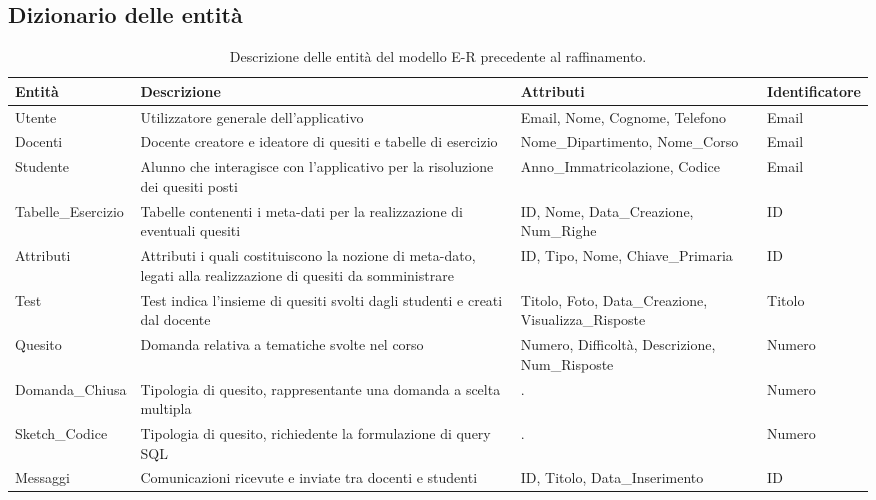 \documentclass{article}
\begin{document}
\subsection{Dizionario delle entità}
\begin{table}[H]
    \centering
    \begin{tabularx}{\textwidth}{|p{2.7cm}|p{5cm}|p{4.3cm}|X|}
        \hline
        \bf Entità & \bf Descrizione & \bf Attributi & \bf Identificatore \\
        \hline
        Utente & Utilizzatore generale dell'applicativo & Email, Nome, Cognome, Telefono & Email \\        
        \hline
        Docenti & Docente creatore e ideatore di quesiti e tabelle di esercizio & Nome\_Dipartimento, Nome\_Corso & Email \\
        \hline
        Studente & Alunno che interagisce con l'applicativo per la risoluzione dei quesiti posti & Anno\_Immatricolazione, Codice & Email \\
        \hline
        Tabelle\_Esercizio & Tabelle contenenti i meta-dati per la realizzazione di eventuali quesiti & ID, Nome, Data\_Creazione, Num\_Righe & ID \\
        \hline
        Attributi & Attributi i quali costituiscono la nozione di meta-dato, legati alla realizzazione di quesiti da somministrare & ID, Tipo, Nome, Chiave\_Primaria & ID \\
        \hline
        Test & Test indica l'insieme di quesiti svolti dagli studenti e creati dal docente & Titolo, Foto, Data\_Creazione, Visualizza\_Risposte & Titolo \\
        \hline
        Quesito & Domanda relativa a tematiche svolte nel corso & Numero, Difficoltà, Descrizione, Num\_Risposte & Numero \\
        \hline
        Domanda\_Chiusa & Tipologia di quesito, rappresentante una domanda a scelta multipla & . & Numero \\
        \hline
        Sketch\_Codice & Tipologia di quesito, richiedente la formulazione di query SQL & . & Numero \\
        \hline
        Messaggi & Comunicazioni ricevute e inviate tra docenti e studenti & ID, Titolo, Data\_Inserimento & ID \\
        \hline
    \end{tabularx}
    \caption{Descrizione delle entità del modello E-R precedente al raffinamento.}
\end{table}
\end{document}
